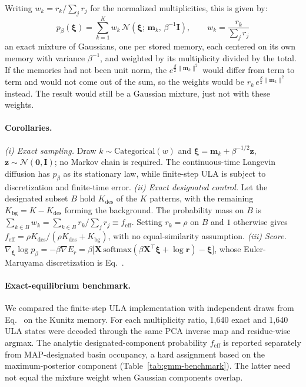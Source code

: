 Writing $w_k = r_k / \sum_j r_j$ for the normalized multiplicities, this is given by:
\begin{equation}
  \boxed{\;
  p_\beta(\boldsymbol{\xi})
  = \sum_{k=1}^{K} w_k\, \mathcal{N}(\boldsymbol{\xi};\,\mathbf{m}_k,\,\beta^{-1}\mathbf{I}),
  \qquad w_k = \frac{r_k}{\sum_j r_j} \; }
\end{equation}
an exact mixture of Gaussians, one per stored memory, each centered on its own
memory with variance $\beta^{-1}$, and weighted by its multiplicity divided by the
total. If the memories had not been unit norm, the
$e^{\frac\beta2\lVert\mathbf{m}_k\rVert^2}$ would differ from term to term and would
not come out of the sum, so the weights would be
$r_k\,e^{\frac\beta2\lVert\mathbf{m}_k\rVert^2}$ instead. The result would still be
a Gaussian mixture, just not with these weights.

\paragraph{Corollaries.}
\emph{(i) Exact sampling.} Draw $k\sim\mathrm{Categorical}(w)$ and
$\boldsymbol{\xi}=\mathbf{m}_k+\beta^{-1/2}\mathbf{z}$, $\mathbf{z}\sim\mathcal{N}(\mathbf{0},\mathbf{I})$;
no Markov chain is required. The continuous-time Langevin diffusion has
$p_\beta$ as its stationary law, while finite-step ULA is subject to
discretization and finite-time error.
\emph{(ii) Exact designated control.} Let the designated subset $B$ hold
$K_{\mathrm{des}}$ of the $K$ patterns, with the remaining
$K_{\mathrm{bg}} = K - K_{\mathrm{des}}$ forming the background. The probability
mass on $B$ is $\sum_{k\in B} w_k = \sum_{k\in B} r_k / \sum_j r_j
\equiv f_{\mathrm{eff}}$. Setting $r_k=\rho$ on $B$ and $1$ otherwise gives
$f_{\mathrm{eff}} = \rho K_{\mathrm{des}} / (\rho K_{\mathrm{des}} +
K_{\mathrm{bg}})$, with no equal-similarity assumption.
\emph{(iii) Score.} $\nabla_{\boldsymbol{\xi}}\log p_\beta
= -\beta\nabla E_r
= \beta\bigl[\mathbf{X}\,\mathrm{softmax}(\beta\mathbf{X}^\top\boldsymbol{\xi}+\log\mathbf{r})
  - \boldsymbol{\xi}\bigr]$, whose Euler-Maruyama discretization is
Eq.~.

\paragraph{Exact-equilibrium benchmark.}
We compared the finite-step ULA implementation with independent draws from
Eq.~ on the Kunitz memory. For each multiplicity ratio,
1{,}640 exact and 1{,}640 ULA states were decoded through the same PCA inverse
map and residue-wise argmax. The analytic designated-component probability
$f_{\mathrm{eff}}$ is reported separately from MAP-designated basin occupancy,
a hard assignment based on the maximum-posterior component
(Table~\ref{tab:gmm-benchmark}). The latter need not equal the mixture weight when
Gaussian components overlap.

